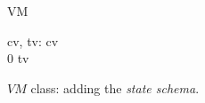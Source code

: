 \begin{figure}[H]
\centering
\begin{class}{VM}
\begin{state}
cv, tv: \integer
{} \leq  cv 
\\
0 \leq  tv 
\end{state} 
\end{class}
\caption{$VM$ class: adding the \textit{state schema}.}
\label{oz_vm_state_schema}
\end{figure}